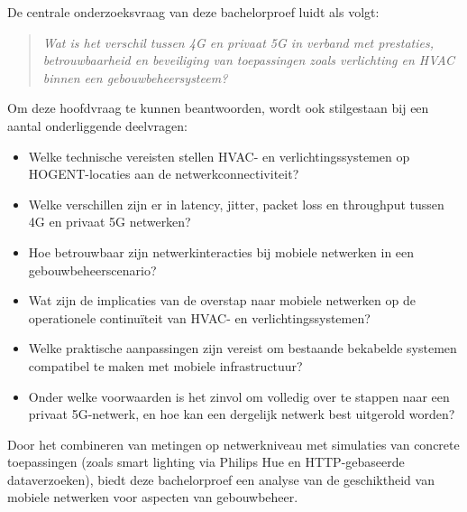 De centrale onderzoeksvraag van deze bachelorproef luidt als volgt:

\begin{quote}
    \textit{Wat is het verschil tussen 4G en privaat 5G in verband met prestaties, betrouwbaarheid en beveiliging van toepassingen zoals verlichting en HVAC binnen een gebouwbeheersysteem?}
\end{quote}

Om deze hoofdvraag te kunnen beantwoorden, wordt ook stilgestaan bij een aantal onderliggende deelvragen:

\begin{itemize}
    \item Welke technische vereisten stellen HVAC- en verlichtingssystemen op HOGENT-locaties aan de netwerkconnectiviteit?
    \item Welke verschillen zijn er in latency, jitter, packet loss en throughput tussen 4G en privaat 5G netwerken?
    \item Hoe betrouwbaar zijn netwerkinteracties bij mobiele netwerken in een gebouwbeheerscenario?
    \item Wat zijn de implicaties van de overstap naar mobiele netwerken op de operationele continuïteit van HVAC- en verlichtingssystemen?
    \item Welke praktische aanpassingen zijn vereist om bestaande bekabelde systemen compatibel te maken met mobiele infrastructuur?
    \item Onder welke voorwaarden is het zinvol om volledig over te stappen naar een privaat 5G-netwerk, en hoe kan een dergelijk netwerk best uitgerold worden?
\end{itemize}

Door het combineren van metingen op netwerkniveau met simulaties van concrete toepassingen (zoals smart lighting via Philips Hue en HTTP-gebaseerde dataverzoeken), biedt deze bachelorproef een analyse van de geschiktheid van mobiele netwerken voor aspecten van gebouwbeheer.

